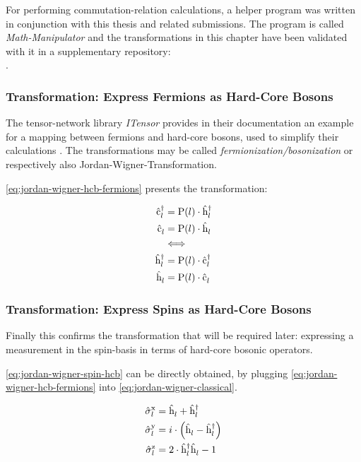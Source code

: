 For performing commutation-relation calculations, a helper program was written in conjunction with this thesis and related submissions.
The program is called \emph{Math-Manipulator} \cite{selfMathManipulator} and the transformations in this chapter have been validated with it in a supplementary repository:\\ .


\subsubsection*{Transformation: Express Fermions as Hard-Core Bosons}
The tensor-network library \emph{ITensor} provides in their documentation an example for a mapping between fermions and hard-core bosons, used to simplify their calculations \cite{itensorFermionizationLibrary}.
The transformations may be called \emph{fermionization/bosonization} or respectively also Jordan-Wigner-Transformation.

\autoref{eq:jordan-wigner-hcb-fermions} presents the transformation:

\begin{equation}
    \label{eq:jordan-wigner-hcb-fermions}
    \begin{split}
        \cop{l}{\dagger} &= \text{P}(l) \cdot \hop{l}{\dagger}\\
        \cop{l}{} &= \text{P}(l) \cdot \hop{l}{}\\
        &\Longleftrightarrow \\
        \hop{l}{\dagger} &= \text{P}(l) \cdot \cop{l}{\dagger}\\
        \hop{l}{} &= \text{P}(l) \cdot \cop{l}{}\\
    \end{split}
\end{equation}

\subsubsection*{Transformation: Express Spins as Hard-Core Bosons}
Finally this confirms the transformation that will be required later: expressing a measurement in the spin-basis in terms of hard-core bosonic operators.

\autoref{eq:jordan-wigner-spin-hcb} can be directly obtained, by plugging \autoref{eq:jordan-wigner-hcb-fermions} into \autoref{eq:jordan-wigner-classical}.

\begin{equation}
    \label{eq:jordan-wigner-spin-hcb}
    \begin{split}
        \pauli[l]{x} &= \hop{l}{} + \hop{l}{\dagger} \\
        \pauli[l]{y} &= i \cdot \left(\hop{l}{} - \hop{l}{\dagger}\right) \\
        \pauli[l]{z} &= 2 \cdot \hop{l}{\dagger}\hop{l}{} -1
    \end{split}
\end{equation}

